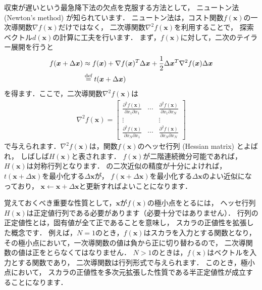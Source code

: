 収束が遅いという最急降下法の欠点を克服する方法として，
ニュートン法 (Newton's method) が知られています．
ニュートン法は，コスト関数$f(\bm{x})$の一次導関数$\nabla f(\bm{x})$だけではなく，
二次導関数$\nabla^2 f(\bm{x})$を利用することで，
探索ベクトル$d(\bm{x})$の計算に工夫を行います．
まず，$f(\bm{x})$に対して，二次のテイラー展開を行うと
\begin{align}
f(\bm{x} + \Delta \bm{x}) 
&\approx f(\bm{x}) + \nabla f(\bm{x})^T \Delta\bm{x}
+ \frac{1}{2} \Delta\bm{x}^T \nabla^2 f(\bm{x}) \Delta\bm{x}
\nonumber\\
&\overset{\mbox{\scriptsize def}}{=} t(\bm{x} + \Delta\bm{x})
\label{eqn:fx_taylor}
\end{align}
を得ます．ここで，二次導関数$\nabla^2 f(\bm{x})$は
\begin{align}
\nabla^2 f(\bm{x}) =
  \begin{bmatrix}
    \displaystyle
    \frac{\partial^2 f(\bm{x})}{\partial x_1 \partial x_1} &
    \cdots&
    \displaystyle
    \frac{\partial^2 f(\bm{x})}{\partial x_1 \partial x_N}\\
    \vdots & & \vdots \\
    \displaystyle
    \frac{\partial^2 f(\bm{x})}{\partial x_N \partial x_1} &
    \cdots& 
    \displaystyle \frac{\partial^2 f(\bm{x})}{\partial x_N \partial x_N}    
  \end{bmatrix}
\end{align}
で与えられます．$\nabla^2 f(\bm{x})$は，関数$f(\bm{x})$のヘッセ行列 (Hessian matrix) とよばれ，
しばしば$H(\bm{x})$と表されます．
$f(\bm{x})$が二階連続微分可能であれば，$H(\bm{x})$は対称行列となります．
の二次近似の精度が十分によければ，
$t(\bm{x} + \Delta\bm{x})$を最小化する$\Delta\bm{x}$が，
$f(\bm{x} + \Delta\bm{x})$を最小化する$\Delta\bm{x}$のよい近似になっており，
$\bm{x} \gets \bm{x} + \Delta\bm{x}$と更新すればよいことになります．

覚えておくべき重要な性質として，$\bm{x}$が$f(\bm{x})$の極小点をとるには，
ヘッセ行列$H(\bm{x})$は正定値行列である必要があります（必要十分ではありません）．
行列の正定値性とは，固有値が全て正であることを意味し，
スカラの正値性を拡張した概念です．
例えば，$N=1$のとき，$f(\bm{x})$はスカラを入力とする関数となり，
その極小点において，一次導関数の値は負から正に切り替わるので，
二次導関数の値は正をとらなくてはなりません．
$N > 1$のときは，$f(\bm{x})$はベクトルを入力とする関数であり，
二次導関数は行列形式で与えられます．
このとき，極小点において，
スカラの正値性を多次元拡張した性質である半正定値性が成立することになります．

